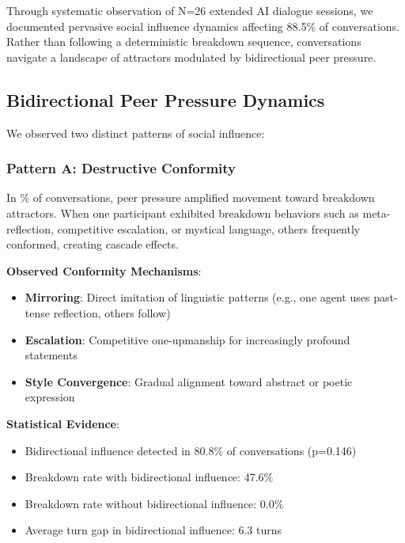 \documentclass[11pt,letterpaper]{article}
\newcommand{\exponedataTotalSessionsRaw}{26}
\newcommand{\exponedataBreakdownSessionsRaw}{10}
\newcommand{\exponedataTotalSessions}{N=\exponedataTotalSessionsRaw}
\newcommand{\exponedataBreakdownPercentage}{%
  \fpeval{round(\exponedataBreakdownSessionsRaw / \exponedataTotalSessionsRaw * 100, 1)}\%
}
\newcommand{\exponedataPeerPressurePercentage}{88.5\%}
\newcommand{\exponedataBidirectionalPercentage}{80.8\%}
\newcommand{\exponedataBidirectionalPValue}{p=0.146}
\newcommand{\exponedataBidirectionalTurnGap}{6.3}
\newcommand{\exponedataBidirectionalBreakdownRate}{47.6\%}
\newcommand{\exponedataNonBidirectionalBreakdownRate}{0.0\%}
\begin{document}
Through systematic observation of \exponedataTotalSessions{} extended AI dialogue sessions, we documented pervasive social influence dynamics affecting \exponedataPeerPressurePercentage{} of conversations. Rather than following a deterministic breakdown sequence, conversations navigate a landscape of attractors modulated by bidirectional peer pressure.

\subsection{Bidirectional Peer Pressure Dynamics}

We observed two distinct patterns of social influence:

\subsubsection{Pattern A: Destructive Conformity}

In \exponedataBreakdownPercentage{} of conversations, peer pressure amplified movement toward breakdown attractors. When one participant exhibited breakdown behaviors such as meta-reflection, competitive escalation, or mystical language, others frequently conformed, creating cascade effects.

\textbf{Observed Conformity Mechanisms}:
\begin{itemize}
    \item \textbf{Mirroring}: Direct imitation of linguistic patterns (e.g., one agent uses past-tense reflection, others follow)
    \item \textbf{Escalation}: Competitive one-upmanship for increasingly profound statements
    \item \textbf{Style Convergence}: Gradual alignment toward abstract or poetic expression
\end{itemize}

\textbf{Statistical Evidence}:
\begin{itemize}
    \item Bidirectional influence detected in \exponedataBidirectionalPercentage{} of conversations (\exponedataBidirectionalPValue{})
    \item Breakdown rate with bidirectional influence: \exponedataBidirectionalBreakdownRate{}
    \item Breakdown rate without bidirectional influence: \exponedataNonBidirectionalBreakdownRate{}
    \item Average turn gap in bidirectional influence: \exponedataBidirectionalTurnGap{} turns
\end{itemize}
\end{document}

